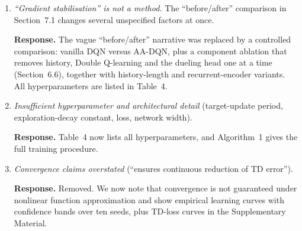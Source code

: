 \documentclass[11pt]{article}
\newcommand{\resp}[1]{\par\noindent\textbf{Response.} #1\par\medskip}
\begin{document}
\begin{enumerate}[label=R1.\arabic*]
\item \textit{``Gradient stabilisation'' is not a method.} The ``before/after'' comparison in Section~7.1 changes several unspecified factors at once.
\resp{The vague ``before/after'' narrative was replaced by a controlled comparison: vanilla DQN versus AA-DQN, plus a component ablation that removes history, Double Q-learning and the dueling head one at a time (Section~6.6), together with history-length and recurrent-encoder variants. All hyperparameters are listed in Table~4.}
\item \textit{Insufficient hyperparameter and architectural detail} (target-update period, exploration-decay constant, loss, network width).
\resp{Table~4 now lists all hyperparameters, and Algorithm~1 gives the full training procedure.}
\item \textit{Convergence claims overstated} (``ensures continuous reduction of TD error'').
\resp{Removed. We now note that convergence is not guaranteed under nonlinear function approximation \cite{tsitsiklis1997} and show empirical learning curves with confidence bands over ten seeds, plus TD-loss curves in the Supplementary Material.}
\end{enumerate}
\end{document}
